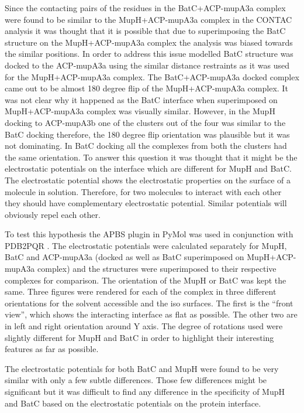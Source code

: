 	Since the contacting pairs of the residues in the BatC+ACP-mupA3a complex were found to be similar to the MupH+ACP-mupA3a complex in the CONTAC analysis it was thought that it is possible that due to superimposing the BatC structure on the MupH+ACP-mupA3a complex the analysis was biased towards the similar positions. In order to address this issue modelled BatC structure was docked to the ACP-mupA3a using the similar distance restraints as it was used for the MupH+ACP-mupA3a complex. The BatC+ACP-mupA3a docked complex came out to be almost 180 degree flip of the MupH+ACP-mupA3a complex. It was not clear why it happened as the BatC interface when superimposed on MupH+ACP-mupA3a complex was visually similar. However, in the MupH docking to ACP-mupA3b one of the clusters out of the four was similar to the BatC docking therefore, the 180 degree flip orientation was plausible but it was not dominating. In BatC docking all the complexes from both the clusters had the same orientation.  To answer this question it was thought that it might be the electrostatic potentials on the interface which are different for MupH and BatC. The electrostatic potential shows the electrostatic properties on the surface of a molecule in solution. Therefore, for two molecules to interact with each other they should have complementary electrostatic potential. Similar potentials will obviously repel each other. 
	
	To test this hypothesis the APBS \parencite{Baker2001} plugin in PyMol was used in conjunction with PDB2PQR \parencite{Dolinsky2004}. The electrostatic potentials were calculated separately for MupH, BatC and ACP-mupA3a (docked as well as BatC superimposed on MupH+ACP-mupA3a complex) and the structures were superimposed to their respective complexes for comparison. The orientation of the MupH or BatC was kept the same. Three figures were rendered for each of the complex in three different orientations for the solvent accessible and the iso surfaces. The first is the \textquotedblleft front view\textquotedblright, which shows the interacting interface as flat as possible. The other two are in left and right orientation around Y axis. The degree of rotations used were slightly different for MupH and BatC in order to highlight their interesting features as far as possible. 
	
	The electrostatic potentials for both BatC and MupH were found to be very similar with only a few subtle differences. Those few differences might be significant but it was difficult to find any difference in the specificity of MupH and BatC based on the electrostatic potentials on the protein interface. 
	
